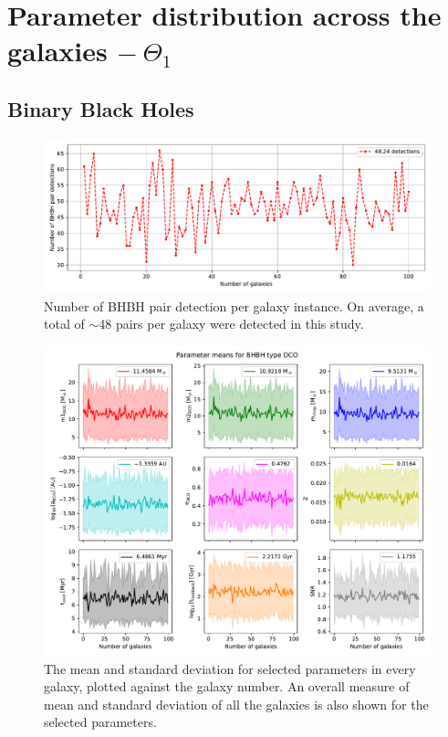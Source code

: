 \section{Parameter distribution across the galaxies $-\ \Theta_1$}
\label{sec:paramter-distribution-across-the-galaxies}
\subsection{Binary Black Holes}
\begin{figure}[!h]
    \centering
    \includegraphics[width=\columnwidth]{analysis_data/004__images_for_latex/BHBH_n_detections}
    \caption{Number of BHBH pair detection per galaxy instance. On average, a total of $\sim$48 pairs per galaxy were detected in this study.}
    \label{fig:bhbhndetections}
\end{figure}

\begin{figure}[!h]
    \centering
    \includegraphics[width=\columnwidth]{analysis_data/004__images_for_latex/BHBH_n_galaxy_mean_plot}
    \caption{The mean and standard deviation for selected parameters in every galaxy, plotted against the galaxy number. An overall measure of mean and standard deviation of all the galaxies is also shown for the selected parameters.}
    \label{fig:bhbh_n_galaxy_mean_plot}
\end{figure}


